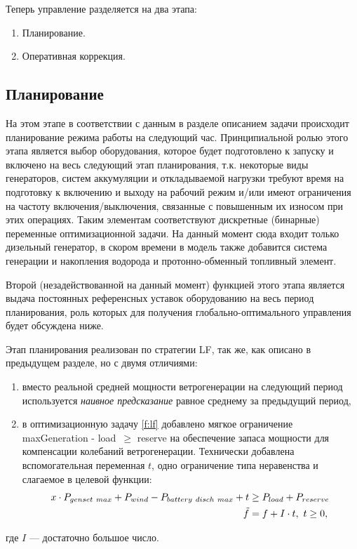 \documentclass{report}
\begin{document}
    Теперь управление разделяется на два этапа: 
    \begin{enumerate}
        \item  Планирование.
        \item Оперативная коррекция.
    \end{enumerate}
    
    \subsection{Планирование}
        На этом этапе в соответствии с данным в разделе \label{sec:planning_problem} описанием задачи происходит планирование режима работы на следующий час.
        Принципиальной ролью этого этапа является выбор оборудования, которое будет подготовлено к запуску и включено на весь следующий этап планирования, т.к. некоторые виды генераторов, систем аккумуляции и откладываемой нагрузки требуют время на подготовку к включению и выходу на рабочий режим и/или имеют ограничения на частоту включения/выключения, связанные с повышенным их износом при этих операциях.
        Таким элементам соответствуют дискретные (бинарные) переменные оптимизационной задачи.
        На данный момент сюда входит только дизельный генератор, в скором времени в модель также добавится система генерации и накопления водорода и протонно-обменный топливный элемент.
        
        Второй (незадействованной на данный момент) функцией этого этапа является выдача постоянных референсных уставок оборудованию на весь период планирования, роль которых для получения глобально-оптимального управления будет обсуждена ниже.
        
        Этап планирования реализован по стратегии LF, так же, как описано в предыдущем разделе, но с двумя отличиями: 
        \begin{enumerate}
            \item  вместо реальной средней мощности ветрогенерации на следующий период используется \textit{наивное предсказание} равное среднему за предыдущий период,
            
            \item  в оптимизационную задачу \ref{f:lf} добавлено мягкое ограничение 
            maxGeneration - load~$\geq$ reserve 
            на обеспечение запаса мощности для компенсации колебаний ветрогенерации.
            Технически добавлена вспомогательная переменная $t$, одно ограничение типа неравенства и слагаемое в целевой функции:
            \begin{equation}
                \begin{split}
                    x \cdot P_{genset~max} + P_{wind} - P_{battery~disch~max} + t &\geq P_{load} + P_{reserve}\\
                    \Tilde{f} &= f + I \cdot t, ~ t \geq 0,
                \end{split}
            \end{equation}
        \end{enumerate}
        где $I$ --- достаточно большое число.
        
\end{document}

